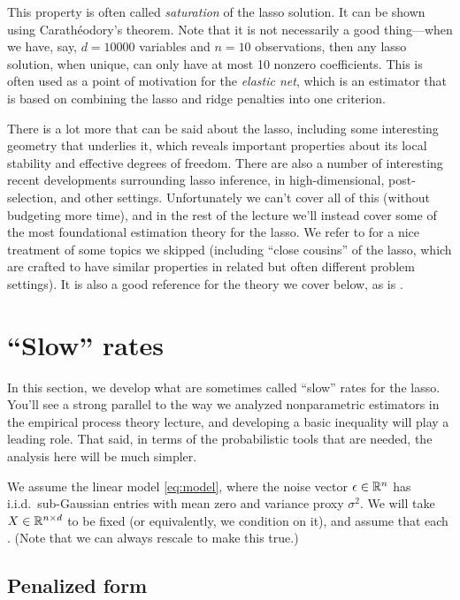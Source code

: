 \documentclass{article}
\begin{document}
This property is often called \emph{saturation} of the lasso solution. It can be
shown using Carath{\'e}odory's theorem. Note that it is not necessarily a good
thing---when we have, say, $d=10000$ variables and $n=10$ observations, then any
lasso solution, when unique, can only have at most 10 nonzero coefficients. This
is often used as a point of motivation for the \emph{elastic net}, which is an
estimator that is based on combining the lasso and ridge penalties into one
criterion.

There is a lot more that can be said about the lasso, including some interesting
geometry that underlies it, which reveals important properties about its local
stability and effective degrees of freedom. There are also a number of
interesting recent developments surrounding lasso inference, in
high-dimensional, post-selection, and other settings. Unfortunately we can't 
cover all of this (without budgeting more time), and in the rest of the lecture
we'll instead cover some of the most foundational estimation theory for the 
lasso. We refer to \citet{hastie2015statistical} for a nice treatment of some
topics we skipped (including ``close cousins'' of the lasso, which are crafted
to have similar properties in related but often different problem settings). It
is also a good reference for the theory we cover below, as is
\citet{buhlmann2011statistics}. 

\section{``Slow'' rates}

In this section, we develop what are sometimes called ``slow'' rates for the
lasso. You'll see a strong parallel to the way we analyzed nonparametric
estimators in the empirical process theory lecture, and developing a basic
inequality will play a leading role. That said, in terms of the probabilistic
tools that are needed, the analysis here will be much simpler.   

We assume the linear model \eqref{eq:model}, where the noise vector $\epsilon
\in \mathbb{R}^n$ has i.i.d.\ sub-Gaussian entries with mean zero and variance proxy  
$\sigma^2$. We will take $X \in \mathbb{R}^{n \times d}$ to be fixed (or equivalently,
we condition on it), and assume that each . (Note that we can always rescale to make this true.)

\subsection{Penalized form}
\end{document}
